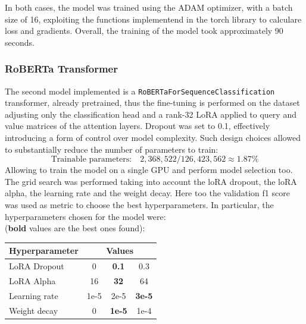             In both cases, the model was trained using the ADAM optimizer, with a batch size of 16,
            exploiting the functions implementend in the torch library to calculare loss and gradients.
            Overall, the training of the model took approximately 90 seconds. \\

        \subsubsection{RoBERTa Transformer}
        \label{subsubsec:roberta}
            The second model implemented is a \texttt{RoBERTaForSequenceClassification} transformer,
            already pretrained, thus the fine-tuning is performed on the dataset adjusting only
            the classification head and a rank-32 LoRA applied to query and value matrices
            of the attention layers. Dropout was set to 0.1, effectively introducing a form
            of control over model complexity. Such design choices allowed to substantially reduce 
            the number of parameters to train:
            \[\text{Trainable parameters:} \quad 2,368,522 / 126,423,562 \approx 1.87\%\]
            Allowing to train the model on a single GPU and perform model selection too.
            The grid search was performed taking into account the loRA dropout, the loRA alpha,
            the learning rate and the weight decay. Here too the validation f1 score was used
            as metric to choose the best hyperparameters. In particular, the hyperparameters 
            chosen for the model were: \\
            (\textbf{bold} values are the best ones found): 

            \begin{table}[H]
                \centering
                \begin{tabular}{l c c c}
                    \toprule
                    \multicolumn{1}{l}{\textbf{Hyperparameter}} & \multicolumn{3}{c}{\textbf{Values}} \\                  \midrule
                    LoRA Dropout & 0 & \textbf{0.1} & 0.3 \\
                    LoRA Alpha & 16 & \textbf{32} & 64 \\
                    Learning rate & 1e-5 & 2e-5 & \textbf{3e-5} \\
                    Weight decay & 0 & \textbf{1e-5} & 1e-4 \\
                    \bottomrule
                \end{tabular}
                \label{tab:roberta_hyperparams}
            \end{table}

